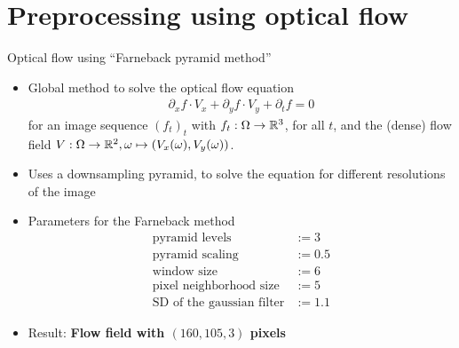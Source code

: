 \section{Preprocessing using optical flow}

\begin{comment}
\begin{frame}{Preprocessing}
    \begin{itemize}
    \item Frame size of $(640,480,3)$ pixels
    \item Cut off last 60 pixels, to remove black frame inside the car
    \item Sample down the frame to half its size, due to computational limitations
    \end{itemize}

\begin{columns}[t]
\begin{column}{.45\textwidth}
\begin{center}
\only<1->{\texttt{[image: ./imgs/frame2\_original.png]}}
\small{Original frame}
\end{center}
\end{column}
\begin{column}{.45\textwidth}
\begin{center}
\only<1->{\texttt{[image: ./imgs/frame2\_cut\_sampled.png]}}
\small{Cut off the last 60 pixels, downsampled}
\end{center}
\end{column}
\end{columns}
\end{frame}
\end{comment}

\begin{frame}{Optical flow using \enquote{Farneback pyramid method}\cite{Farneback2003}}

\begin{itemize}
\item Global method to solve the optical flow equation
\begin{align*}
\partial_x f \cdot V_x + \partial_y f \cdot  V_y + \partial_t f  = 0
\end{align*}
for an image sequence $(f_t)_t$ with $f_t : \Omega \to {\mathbb{R}}^3$, for all $t$, and the (dense) flow field $V : \Omega \to {\mathbb{R}}^2, \omega \mapsto (V_x(\omega), V_y(\omega))$.
\item Uses a downsampling pyramid, to solve the equation for different resolutions of the image
\item Parameters for the Farneback method
\begin{align*}
\text{pyramid levels} &:= 3\\
\text{pyramid scaling} &:= 0.5\\
\text{window size} &:= 6\\
\text{pixel neighborhood size} &:= 5\\
\text{SD of the gaussian filter} &:= 1.1
\end{align*}
\item Result: \textbf{Flow field with $(160,105,3)$ pixels}
\end{itemize}
\end{frame}

